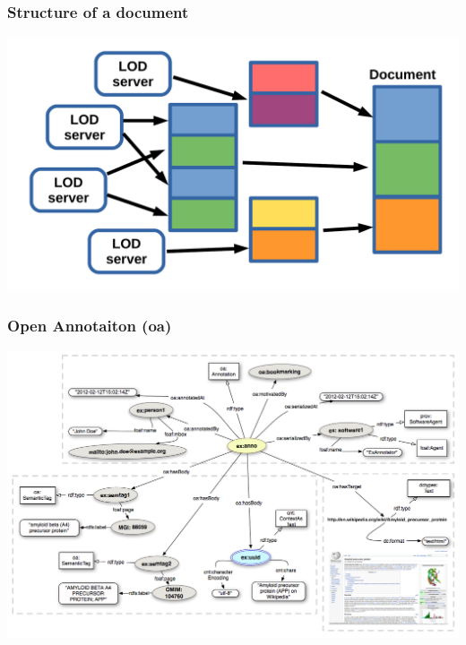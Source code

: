 \documentclass[10pt]{beamer}
\begin{document}
\begin{frame}
  \frametitle{Structure of a document}
  \centering
  \includegraphics[width=1\linewidth]{document-structural-view.pdf}
\end{frame}

\begin{frame}
  \frametitle{Open Annotaiton (oa)}
\begin{adjustwidth}{-3em}{-3em}
  \centering
  \includegraphics[width=1\linewidth]{Open-Annotation_CB_Bookmarking_and_Semantically_Tagging_A_webpage_spec20130128.png}
\end{adjustwidth}

\end{frame}
\end{document}
